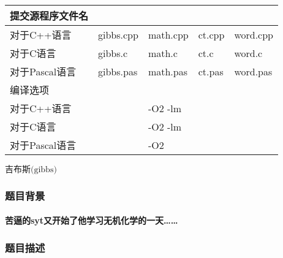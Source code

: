 \documentclass[final,11pt,oneside,UTF8]{report}
\begin{document}
\begin{table}[h]
\begin{tabular}{lllll}
        提交源程序文件名                     &                                &                                 &                                     &                               \\ \hline
        \multicolumn{1}{|l|}{对于C++语言}    & \multicolumn{1}{l|}{gibbs.cpp} & \multicolumn{1}{l|}{math.cpp}   & \multicolumn{1}{l|}{ct.cpp}         & \multicolumn{1}{l|}{word.cpp} \\ \hline
        \multicolumn{1}{|l|}{对于C语言}      & \multicolumn{1}{l|}{gibbs.c}   & \multicolumn{1}{l|}{math.c}     & \multicolumn{1}{l|}{ct.c}           & \multicolumn{1}{l|}{word.c}   \\ \hline
        \multicolumn{1}{|l|}{对于Pascal语言} & \multicolumn{1}{l|}{gibbs.pas} & \multicolumn{1}{l|}{math.pas}   & \multicolumn{1}{l|}{ct.pas}         & \multicolumn{1}{l|}{word.pas} \\ \hline
        编译选项                             &                                &                                 &                                     &                               \\ \hline
        \multicolumn{1}{|l|}{对于C++语言}    & \multicolumn{1}{l}{}           & \multicolumn{1}{l}{-O2 -lm}     & \multicolumn{1}{l}{}                & \multicolumn{1}{l|}{}         \\ \hline
        \multicolumn{1}{|l|}{对于C语言}      & \multicolumn{1}{l}{}           & \multicolumn{1}{l}{-O2 -lm}     & \multicolumn{1}{l}{}                & \multicolumn{1}{l|}{}         \\ \hline
        \multicolumn{1}{|l|}{对于Pascal语言} & \multicolumn{1}{l}{}           & \multicolumn{1}{l}{-O2}         & \multicolumn{1}{l}{}                & \multicolumn{1}{l|}{}         \\ \hline
    \end{tabular}
\end{table}
\newpage

\centerline{\LARGE{$\textbf{吉布斯}\text{(gibbs)}$}}
\subsubsection{题目背景}
\paragraph{
    苦逼的syt又开始了他学习无机化学的一天……
}
\subsubsection{题目描述}
\end{document}
